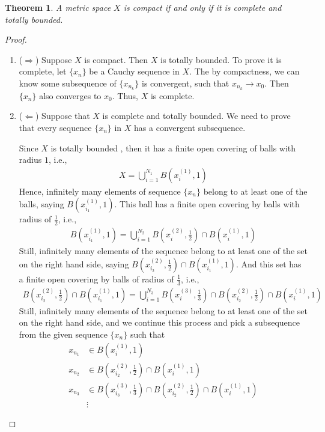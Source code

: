 \documentclass[12pt,leqno]{amsart}
\newtheorem{theorem}{Theorem}[section]
\theoremstyle{definition}
\numberwithin{equation}{subsection}
\begin{document}
\begin{theorem}
A metric space $X$ is compact if and only if it is complete and totally bounded.
\end{theorem}
\begin{proof}
~\begin{enumerate}
    \item ($\Rightarrow$) Suppose $X$ is compact. Then $X$ is totally bounded. To prove it is complete, let $\{x_n\}$ be a Cauchy sequence in $X$.  The by compactness, we can know some subsequence of $\{x_{n_k}\}$ is convergent, such that $x_{n_k}\to x_0$. Then $\{x_n\}$ also converges to $x_0$. Thus, $X$ is complete.
    \item ($\Leftarrow$) Suppose that $X$ is complete and totally bounded. We need to prove that every sequence $\{x_n\}$ in $X$ has a convergent subsequence. 
    
    Since $X$ is totally bounded , then it has a finite open covering of balls with radius $1$, i.e.,
    \begin{align*}
        X = \bigcup^{N_1}_{i=1}B\left(x_i^{(1)},1\right)
    \end{align*}
    Hence, infinitely many elements of sequence $\{x_n\}$ belong to at least one of the balls, saying $B(x_{i_1}^{(1)},1)$. This ball has a finite open covering by balls with radius of $\frac{1}{2}$, i.e.,
    \begin{align*}
        B(x_{i_1}^{(1)},1) = \bigcup^{N_2}_{i=1}B\left(x_i^{(2)},\frac{1}{2}\right)\cap B\left(x_i^{(1)},1\right)
    \end{align*}
    Still, infinitely many elements of the sequence belong to at least one of the set on the right hand side, saying $B\left(x_{i_2}^{(2)},\frac{1}{2}\right)\cap B(x_{i_1}^{(1)},1)$. And this set has a finite open covering by balls of radius of $\frac{1}{3}$, i.e.,
    \begin{align*}
        B\left(x_{i_2}^{(2)},\frac{1}{2}\right)\cap B(x_{i_1}^{(1)},1) = \bigcup^{N_3}_{i=1} B\left(x_{i}^{(3)},\frac{1}{3}\right)\cap B\left(x_{i_2}^{(2)},\frac{1}{2}\right)\cap B\left(x_i^{(1)},1\right)
    \end{align*}
    Still, infinitely many elements of the sequence belong to at least one of the set on the right hand side, and we continue this process and pick a subsequence from the given sequence $\{x_n\}$ such that 
    \begin{align*}
        x_{n_1} &\in B\left(x_i^{(1)},1\right) \\
        x_{n_2} &\in B\left(x_{i_2}^{(2)},\frac{1}{2}\right)\cap B\left(x_i^{(1)},1\right) \\
        x_{n_3} &\in B\left(x_{i_3}^{(3)},\frac{1}{3}\right)\cap B\left(x_{i_2}^{(2)},\frac{1}{2}\right)\cap B\left(x_i^{(1)},1\right)\\
        & \vdots
    \end{align*}
    

\end{enumerate}
\end{proof}
\end{document}
